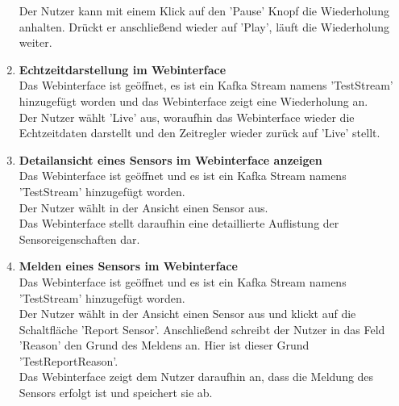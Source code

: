 \begin{enumerate}[label=\textbf{TI\arabic{enumi}0}]
		Der Nutzer kann mit einem Klick auf den 'Pause' Knopf die Wiederholung anhalten. Drückt er anschließend wieder auf 'Play', läuft die Wiederholung weiter.
	\item \textbf{Echtzeitdarstellung im Webinterface}\\
		Das Webinterface ist geöffnet, es ist ein Kafka Stream namens 'TestStream' hinzugefügt worden und das Webinterface zeigt eine Wiederholung an.\\
		Der Nutzer wählt 'Live' aus, woraufhin das Webinterface wieder die Echtzeitdaten darstellt und den Zeitregler wieder zurück auf 'Live' stellt.\par
	\item \textbf{Detailansicht eines Sensors im Webinterface anzeigen}\\
		Das Webinterface ist geöffnet und es ist ein Kafka Stream namens 'TestStream' hinzugefügt worden.\\
		Der Nutzer wählt in der Ansicht einen Sensor aus.\\
		Das Webinterface stellt daraufhin eine detaillierte Auflistung der Sensoreigenschaften dar.\par
	\item \textbf{Melden eines Sensors im Webinterface}\\
		Das Webinterface ist geöffnet und es ist ein Kafka Stream namens 'TestStream' hinzugefügt worden.\\
		Der Nutzer wählt in der Ansicht einen Sensor aus und klickt auf die Schaltfläche 'Report Sensor'. Anschließend schreibt der Nutzer in das Feld 'Reason' den Grund des Meldens an. Hier ist dieser Grund 'TestReportReason'.\\
		Das Webinterface zeigt dem Nutzer daraufhin an, dass die Meldung des Sensors erfolgt ist und speichert sie ab.\par
		
\end{enumerate}